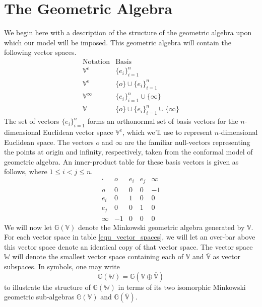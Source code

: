 \documentclass{birkjour}
\theoremstyle{definition}
\theoremstyle{remark}
\numberwithin{equation}{section}
\newcommand{\G}{\mathbb{G}}
\newcommand{\V}{\mathbb{V}}
\newcommand{\Vb}{\mathbb{\overline{V}}}
\newcommand{\W}{\mathbb{W}}
\newcommand{\nvao}{o}
\newcommand{\nvai}{\infty}
\begin{document}
\section{The Geometric Algebra}

We begin here with a description of the structure of the geometric algebra upon
which our model will be imposed.  This
geometric algebra will contain the following vector spaces.
\begin{equation}\label{equ_vector_spaces}
\begin{array}{ll}
\mbox{Notation} & \mbox{Basis} \\
\hline
\V^e & \{e_i\}_{i=1}^n \\
\V^{\nvao} & \{\nvao\}\cup\{e_i\}_{i=1}^n \\
\V^{\nvai} & \{e_i\}_{i=1}^n\cup\{\nvai\} \\
\V & \{\nvao\}\cup\{e_i\}_{i=1}^n\cup\{\nvai\}
\end{array}
\end{equation}
The set of vectors $\{e_i\}_{i=1}^n$ forms an orthonormal set of basis
vectors for the $n$-dimensional Euclidean vector space $\V^e$, which we'll
use to represent $n$-dimensional Euclidean space.
The vectors $\nvao$ and $\nvai$ are the familiar null-vectors representing the
points at origin and infinity, respectively, taken from the conformal model of geometric algebra.
An inner-product table for these basis vectors is given as follows, where
$1\leq i<j\leq n$.
\begin{equation}
\begin{array}{c|cccc}
\cdot & \nvao & e_i & e_j & \nvai \\
\hline
\nvao & 0 & 0 & 0 & -1 \\
e_i & 0 & 1 & 0 & 0 \\
e_j & 0 & 0 & 1 & 0 \\
\nvai & -1 & 0 & 0 & 0
\end{array}
\end{equation}
We will now let $\G(\V)$ denote the Minkowski geometric algebra generated by $\V$.
For each vector space in table \eqref{equ_vector_spaces}, we will let an over-bar
above this vector space denote an identical copy of that vector space.  The vector
space $\W$ will denote the smallest vector space containing each of $\V$ and $\Vb$
as vector subspaces.  In symbols, one may write
\begin{equation}
\G(\W) = \G(\V\oplus\Vb)
\end{equation}
to illustrate the structure of $\G(\W)$ in terms of its two isomorphic Minkowski
geometric sub-algebras $\G(\V)$ and $\G(\Vb)$.
\end{document}
